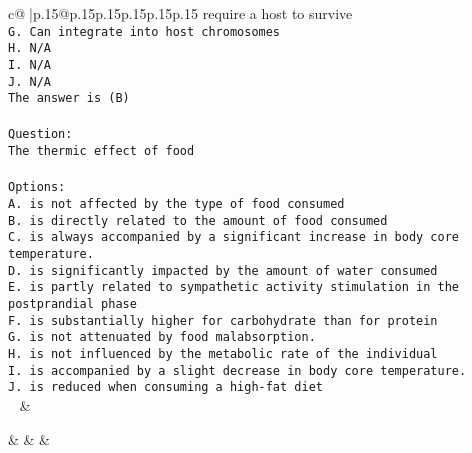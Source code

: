 \documentclass{article}
\begin{document}
{\begin{supertabular}{c@{$\;$}|p{.15\linewidth}@{}p{.15\linewidth}p{.15\linewidth}p{.15\linewidth}p{.15\linewidth}p{.15\linewidth}}
{{{require a host to survive\\ \tt G. Can integrate into host chromosomes\\ \tt H. N/A\\ \tt I. N/A\\ \tt J. N/A\\ \tt The answer is (B)\\ \tt \\ \tt Question:\\ \tt The thermic effect of food\\ \tt \\ \tt Options:\\ \tt A. is not affected by the type of food consumed\\ \tt B. is directly related to the amount of food consumed\\ \tt C. is always accompanied by a significant increase in body core temperature.\\ \tt D. is significantly impacted by the amount of water consumed\\ \tt E. is partly related to sympathetic activity stimulation in the postprandial phase\\ \tt F. is substantially higher for carbohydrate than for protein\\ \tt G. is not attenuated by food malabsorption.\\ \tt H. is not influenced by the metabolic rate of the individual\\ \tt I. is accompanied by a slight decrease in body core temperature.\\ \tt J. is reduced when consuming a high-fat diet\\ \tt  
	  } 
	   } 
	   } 
	 & \\ 
 

    \theutterance {}  

    &  
	 & & \\ 
 


\end{supertabular}}
\end{document}
